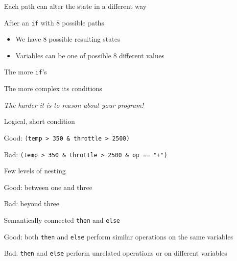 \documentclass{beamer}
\begin{document}
\begin{slide}{
\item Each path can alter the state in a different way
\item After an \texttt{if} with 8 possible paths
\begin{itemize}
\item We have 8 possible resulting states
\item Variables can be one of possible 8 different values
\end{itemize}
}\end{slide}

\begin{slide}{
\item The more \texttt{if}'s
\item The more complex its conditions
\item \textit{The harder it is to reason about your program!}
}\end{slide}

\begin{slide}{
\item Logical, short condition
\item Good: \texttt{(temp > 350 \& throttle > 2500)}
\item Bad: \texttt{(temp > 350 \& throttle > 2500 \& op == "+")}
}\end{slide}

\begin{slide}{
\item Few levels of nesting
\item Good: between one and three
\item Bad: beyond three
}\end{slide}

\begin{slide}{
\item Semantically connected \texttt{then} and \texttt{else}
\item Good: both \texttt{then} and \texttt{else} perform similar operations on the same variables
\item Bad: \texttt{then} and \texttt{else} perform unrelated operations or on different variables
}\end{slide}
\end{document}
